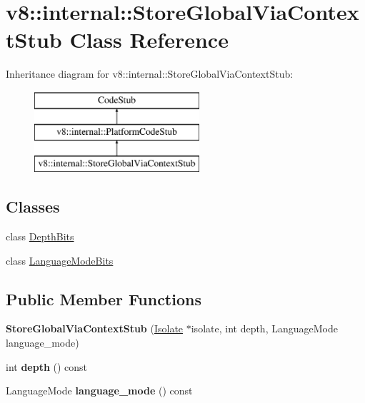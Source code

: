 \hypertarget{classv8_1_1internal_1_1_store_global_via_context_stub}{}\section{v8\+:\+:internal\+:\+:Store\+Global\+Via\+Context\+Stub Class Reference}
\label{classv8_1_1internal_1_1_store_global_via_context_stub}
Inheritance diagram for v8\+:\+:internal\+:\+:Store\+Global\+Via\+Context\+Stub\+:\begin{figure}[H]
\begin{center}
\leavevmode
\includegraphics[height=3.000000cm]{classv8_1_1internal_1_1_store_global_via_context_stub}
\end{center}
\end{figure}
\subsection*{Classes}
\begin{DoxyCompactItemize}
\item 
class \hyperlink{classv8_1_1internal_1_1_store_global_via_context_stub_1_1_depth_bits}{Depth\+Bits}
\item 
class \hyperlink{classv8_1_1internal_1_1_store_global_via_context_stub_1_1_language_mode_bits}{Language\+Mode\+Bits}
\end{DoxyCompactItemize}
\subsection*{Public Member Functions}
\begin{DoxyCompactItemize}
\item 
{\bfseries Store\+Global\+Via\+Context\+Stub} (\hyperlink{classv8_1_1internal_1_1_isolate}{Isolate} $\ast$isolate, int depth, Language\+Mode language\+\_\+mode)\hypertarget{classv8_1_1internal_1_1_store_global_via_context_stub_a2d6f2faaa6a1a6d0d0a2187bbd871ece}{}\label{classv8_1_1internal_1_1_store_global_via_context_stub_a2d6f2faaa6a1a6d0d0a2187bbd871ece}

\item 
int {\bfseries depth} () const \hypertarget{classv8_1_1internal_1_1_store_global_via_context_stub_ae4fca193587bcca55f96f38b0b783711}{}\label{classv8_1_1internal_1_1_store_global_via_context_stub_ae4fca193587bcca55f96f38b0b783711}

\item 
Language\+Mode {\bfseries language\+\_\+mode} () const \hypertarget{classv8_1_1internal_1_1_store_global_via_context_stub_af7faaada74ef623d9c5570d5907a0533}{}\label{classv8_1_1internal_1_1_store_global_via_context_stub_af7faaada74ef623d9c5570d5907a0533}

\end{DoxyCompactItemize}
